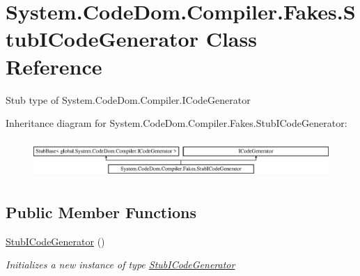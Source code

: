 \hypertarget{class_system_1_1_code_dom_1_1_compiler_1_1_fakes_1_1_stub_i_code_generator}{\section{System.\-Code\-Dom.\-Compiler.\-Fakes.\-Stub\-I\-Code\-Generator Class Reference}
\label{class_system_1_1_code_dom_1_1_compiler_1_1_fakes_1_1_stub_i_code_generator}
}


Stub type of System.\-Code\-Dom.\-Compiler.\-I\-Code\-Generator 


Inheritance diagram for System.\-Code\-Dom.\-Compiler.\-Fakes.\-Stub\-I\-Code\-Generator\-:\begin{figure}[H]
\begin{center}
\leavevmode
\includegraphics[height=1.465969cm]{class_system_1_1_code_dom_1_1_compiler_1_1_fakes_1_1_stub_i_code_generator}
\end{center}
\end{figure}
\subsection*{Public Member Functions}
\begin{DoxyCompactItemize}
\item 
\hyperlink{class_system_1_1_code_dom_1_1_compiler_1_1_fakes_1_1_stub_i_code_generator_a8e225554284ef8c02ba4d24c5a41f426}{Stub\-I\-Code\-Generator} ()
\begin{DoxyCompactList}\small\item\em Initializes a new instance of type \hyperlink{class_system_1_1_code_dom_1_1_compiler_1_1_fakes_1_1_stub_i_code_generator}{Stub\-I\-Code\-Generator}\end{DoxyCompactList}\end{DoxyCompactItemize}
